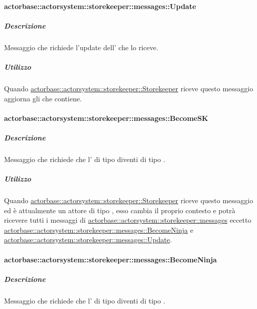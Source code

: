 \documentclass{scalatekids-article}
\begin{document}
\paragraph{actorbase::actorsystem::storekeeper::messages::Update}
\label{sec:actorbase::actorsystem::storekeeper::messages::Update}

\subparagraph{Descrizione}

Messaggio che richiede l'update dell' che lo riceve.

\subparagraph{Utilizzo}

Quando \hyperref[sec:actorbase::actorsystem::storekeeper::Storekeeper]{actorbase::actorsystem::storekeeper::Storekeeper}
riceve questo messaggio aggiorna gli  che contiene.

\paragraph{actorbase::actorsystem::storekeeper::messages::BecomeSK}
\label{sec:actorbase::actorsystem::storekeeper::messages::BecomeSK}

\subparagraph{Descrizione}

Messaggio che richiede che l' di tipo  diventi di tipo
.

\subparagraph{Utilizzo}
Quando \hyperref[sec:actorbase::actorsystem::storekeeper::Storekeeper]{actorbase::actorsystem::storekeeper::Storekeeper}
riceve questo messaggio ed è attualmente un attore di tipo ,
esso cambia il proprio contesto e potrà ricevere tutti i messaggi
di \hyperref[sec:actorbase::actorsystem::storekeeper::messages]{actorbase::\allowbreak{}actorsystem::\allowbreak{}storekeeper::\allowbreak{}messages}
eccetto \hyperref[sec:actorbase::actorsystem::storekeeper::messages::BecomeNinja]{actorbase::\allowbreak{}actorsystem::\allowbreak{}storekeeper::\allowbreak{}messages::\allowbreak{}BecomeNinja} e
\hyperref[sec:actorbase::actorsystem::storekeeper::messages::Update]{actorbase::\allowbreak{}actorsystem::\allowbreak{}storekeeper::\allowbreak{}messages::\allowbreak{}Update}.

\paragraph{actorbase::actorsystem::storekeeper::messages::BecomeNinja}
\label{sec:actorbase::actorsystem::storekeeper::messages::BecomeNinja}

\subparagraph{Descrizione}
Messaggio che richiede che l' di tipo  diventi di tipo
.
\end{document}
